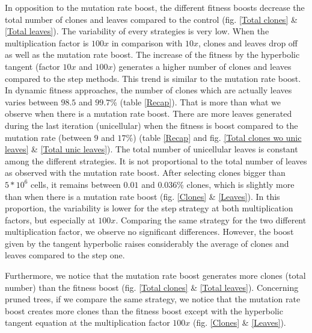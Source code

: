 \documentclass[a4paper]{article}
\begin{document}
\begin{multicols}{2}
In opposition to the mutation rate boost, the different fitness boosts decrease the total number of clones and leaves compared to the control (fig. \ref{Total clones} \& \ref{Total leaves}). The variability of every strategies is very low. When the multiplication factor is $100x$ in comparison with $10x$, clones and leaves drop off as well as the mutation rate boost. The increase of the fitness by the hyperbolic tangent (factor $10x$ and $100x$) generates a higher number of clones and leaves compared to the step methods. This trend is similar to the mutation rate boost. In dynamic fitness approaches, the number of clones which are actually leaves varies between $98.5$ and $99.7$\% (table \ref{Recap}). That is more than what we observe when there is a mutation rate boost. There are more leaves generated during the last iteration (unicellular) when the fitness is boost compared to the mutation rate (between $9$ and $17$\%) (table \ref{Recap} and fig. \ref{Total clones wo unic leaves} \& \ref{Total unic leaves}). The total number of unicellular leaves is constant among the different strategies. It is not proportional to the total number of leaves as observed with the mutation rate boost. After selecting clones bigger than $5*10^6$ cells, it remains between $0.01$ and $0.036$\% clones, which is slightly more than when there is a mutation rate boost (fig. \ref{Clones} \& \ref{Leaves}). In this proportion, the variability is lower for the step strategy at both multiplication factors, but especially at $100x$. Comparing the same strategy for the two different multiplication factor, we observe no significant differences. However, the boost given by the tangent hyperbolic raises considerably the average of clones and leaves compared to the step one.



Furthermore, we notice that the mutation rate boost generates more clones (total number) than the fitness boost (fig. \ref{Total clones} \& \ref{Total leaves}). Concerning pruned trees, if we compare the same strategy, we notice that the mutation rate boost creates more clones than the fitness boost except with the hyperbolic tangent equation at the multiplication factor $100x$ (fig. \ref{Clones} \& \ref{Leaves}). 



\end{multicols}
\end{document}

